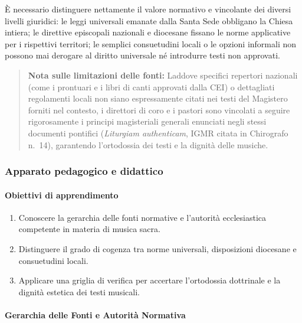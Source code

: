 \documentclass[12pt,a4paper]{article}
\begin{document}
	È necessario distinguere nettamente il valore normativo e vincolante dei diversi livelli giuridici: le leggi universali emanate dalla Santa Sede obbligano la Chiesa intiera; le direttive episcopali nazionali e diocesane fissano le norme applicative per i rispettivi territori; le semplici consuetudini locali o le opzioni informali non possono mai derogare al diritto universale né introdurre testi non approvati.
	
	\begin{quote}
		\textbf{Nota sulle limitazioni delle fonti:} Laddove specifici repertori nazionali (come i prontuari e i libri di canti approvati dalla CEI) o dettagliati regolamenti locali non siano espressamente citati nei testi del Magistero forniti nel contesto, i direttori di coro e i pastori sono vincolati a seguire rigorosamente i principi magisteriali generali enunciati negli stessi documenti pontifici (\emph{Liturgiam authenticam}, IGMR citata in Chirografo n.~14), garantendo l'ortodossia dei testi e la dignità delle musiche.
	\end{quote}
	
	\subsubsection{Apparato pedagogico e didattico}\label{apparato-pedagogico-e-didattico-3}
	
	\paragraph{Obiettivi di apprendimento}\label{obiettivi-di-apprendimento-3}
	
	\begin{enumerate}[label=\arabic*.,leftmargin=*]
		\item Conoscere la gerarchia delle fonti normative e l'autorità ecclesiastica competente in materia di musica sacra.
		\item Distinguere il grado di cogenza tra norme universali, disposizioni diocesane e consuetudini locali.
		\item Applicare una griglia di verifica per accertare l'ortodossia dottrinale e la dignità estetica dei testi musicali.
	\end{enumerate}
	
	\paragraph{Gerarchia delle Fonti e Autorità Normativa}\label{gerarchia-delle-fonti-e-autorita-normativa}
	
\end{document}
